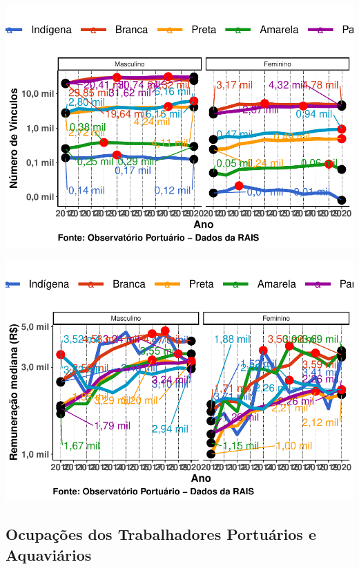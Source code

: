 \documentclass[
]{article}
\begin{document}
\includegraphics{mercado_trabalho_files/figure-latex/g_operacao_raca_sexo-1.pdf}

\includegraphics{mercado_trabalho_files/figure-latex/g_operacao_remuneracao _mediana_raca_sexo-1.pdf}

\hypertarget{ocupauxe7uxf5es-dos-trabalhadores-portuuxe1rios-e-aquaviuxe1rios}{%
\subsection{Ocupações dos Trabalhadores Portuários e
Aquaviários}\label{ocupauxe7uxf5es-dos-trabalhadores-portuuxe1rios-e-aquaviuxe1rios}}
\end{document}
